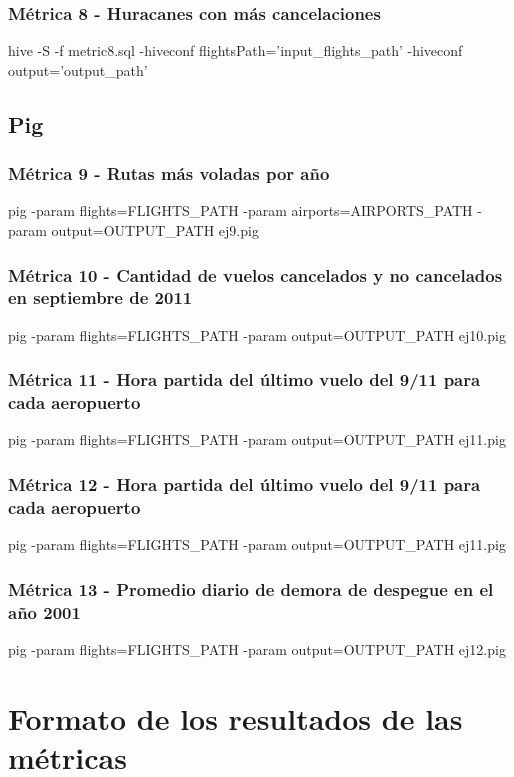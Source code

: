 \documentclass[a4paper,10pt]{article}
\begin{document}
        \subsubsection{Métrica 8 - Huracanes con más cancelaciones}
        \footnotesize{hive -S -f metric8.sql -hiveconf flightsPath='input\_flights\_path' -hiveconf output='output\_path'}

    \subsection{Pig}
        \subsubsection{Métrica 9 - Rutas más voladas por año}
            \footnotesize{pig -param flights=FLIGHTS\_PATH -param airports=AIRPORTS\_PATH -param output=OUTPUT\_PATH ej9.pig}
        \subsubsection{Métrica 10 - Cantidad de vuelos cancelados y no cancelados en septiembre de 2011}
            \footnotesize{pig -param flights=FLIGHTS\_PATH -param output=OUTPUT\_PATH ej10.pig}
        \subsubsection{Métrica 11 - Hora partida del último vuelo del 9/11 para cada aeropuerto}
            \footnotesize{pig -param flights=FLIGHTS\_PATH -param output=OUTPUT\_PATH ej11.pig}
        \subsubsection{Métrica 12 - Hora partida del último vuelo del 9/11 para cada aeropuerto}
            \footnotesize{pig -param flights=FLIGHTS\_PATH -param output=OUTPUT\_PATH ej11.pig}
        \subsubsection{Métrica 13 - Promedio diario de demora de despegue en el año 2001 }
            \footnotesize{pig -param flights=FLIGHTS\_PATH -param output=OUTPUT\_PATH ej12.pig}

\small
\section{Formato de los resultados de las métricas}
\end{document}
